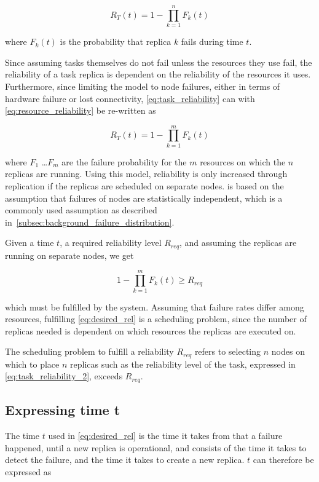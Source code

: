 \documentclass{cslthse-msc}
\begin{document}
\begin{equation} \label{eq:task_reliability}
R_{T}(t) = 1 - \prod\limits_{k=1}^n F_{k}(t)
\end{equation}

where $F_{k}(t)$ is the probability that replica $k$ fails during time $t$. 

Since assuming tasks themselves do not fail unless the resources they use fail, the reliability of a task replica is dependent on the reliability of the resources it uses. Furthermore, since limiting the model to node failures, either in terms of hardware failure or lost connectivity, \cref{eq:task_reliability} can with \cref{eq:resource_reliability} be re-written as

\begin{equation} \label{eq:task_reliability_2}
R_{T}(t) = 1 - \prod\limits_{k=1}^m F_{k}(t)
\end{equation}

where $F_1$ \dots $F_m$ are the failure probability for the $m$ resources on which the $n$ replicas are running. Using this model, reliability is only increased through replication if the replicas are scheduled on separate nodes.  is based on the assumption that failures of nodes are statistically independent, which is a commonly used assumption as described in~\cref{subsec:background_failure_distribution}.

Given a time $t$, a required reliability level $R_{req}$, and assuming the replicas are running on separate nodes, we get

\begin{equation} \label{eq:desired_rel}
1 - \prod\limits_{k=1}^m F_{k}(t) \geq R_{req}
\end{equation}

which must be fulfilled by the system. Assuming that failure rates differ among resources, fulfilling \cref{eq:desired_rel} is a scheduling problem, since the number of replicas needed is dependent on which resources the replicas are executed on.

The scheduling problem to fulfill a reliability $R_{req}$ refers to selecting $n$ nodes on which to place $n$ replicas such as the reliability level of the task, expressed in \cref{eq:task_reliability_2}, exceeds $R_{req}$.

\subsection{Expressing time t} \label{sec:design_time_t}
The time $t$ used in \cref{eq:desired_rel} is the time it takes from that a failure happened, until a new replica is operational, and consists of the time it takes to detect the failure, and the time it takes to create a new replica. $t$ can therefore be expressed as 
\end{document}
